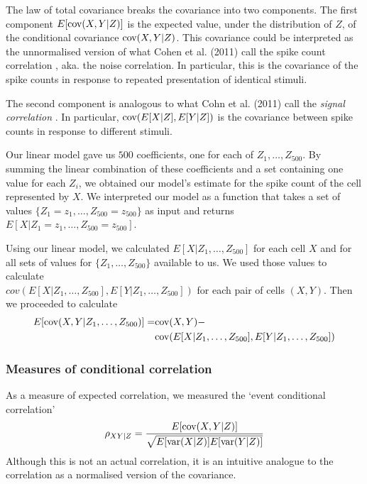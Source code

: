         The law of total covariance breaks the covariance into two components. The first component $E[\text{cov}(X,Y|Z)]$ is the expected value, under the distribution of $Z$, of the conditional covariance $\text{cov}(X,Y|Z)$. This covariance could be interpreted as the unnormalised version of what Cohen et al. (2011) call the spike count correlation \parencite{cohen2}, aka. the noise correlation. In particular, this is the covariance of the spike counts in response to repeated presentation of identical stimuli.

        The second component is analogous to what Cohn et al. (2011) call the \textit{signal correlation} \parencite{cohen2}. In particular, $\text{cov}(E[X|Z], E[Y|Z])$ is the covariance between spike counts in response to different stimuli.

        Our linear model gave us $500$ coefficients, one for each of $Z_1, \dots, Z_500$. By summing the linear combination of these coefficients and a set containing one value for each $Z_i$, we obtained our model's estimate for the spike count of the cell represented by $X$. We interpreted our model as a function that takes a set of values $\lbrace Z_1 = z_1,\dots,Z_{500} = z_{500} \rbrace$ as input and returns $E[X|Z_1=z_1,\dots,Z_{500}=z_{500}]$.

        Using our linear model, we calculated $E[X|Z_1,\dots, Z_{500}]$ for each cell $X$ and for all sets of values for $\lbrace Z_1,\dots,Z_{500} \rbrace$ available to us. We used those values to calculate \\ $cov(E[X|Z_1,\dots, Z_{500}], E[Y|Z_1,\dots, Z_{500}])$ for each pair of cells $(X,Y)$. Then we proceeded to calculate
        \begin{equation}
            \begin{split}
                E[\text{cov}(X,Y|Z_1,\dots, Z_{500})] = & \text{cov}(X,Y) - \\
                  & \text{cov}(E[X|Z_1,\dots, Z_{500}], E[Y|Z_1,\dots, Z_{500}])
            \end{split}
        \end{equation}

        \subsubsection{Measures of conditional correlation}\label{sec:cond_corr}
        As a measure of expected correlation, we measured the `event conditional correlation'  \parencite{maugis}
        \begin{align}\label{eq:event_conditional_correlation}
            \rho_{XY|Z} = \frac{E[\text{cov}(X,Y|Z)]}{\sqrt{E[\text{var}(X|Z)]E[\text{var}(Y|Z)]}}
        \end{align}
        Although this is not an actual correlation, it is an intuitive analogue to the correlation as a normalised version of the covariance.

